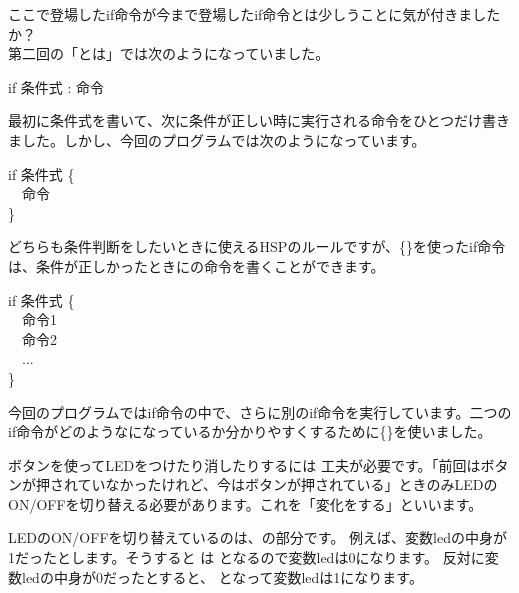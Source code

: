 \documentclass[text03.tex]{subfiles}
\begin{document}
ここで登場したif命令が今まで登場したif命令とは少しうことに気が付きましたか？\\
第二回の「とは」では次のようになっていました。\\
\begin{center}
 					if 条件式 : 命令 \\
\end{center}
最初に条件式を書いて、次に条件が正しい時に実行される命令をひとつだけ書きました。しかし、今回のプログラムでは次のようになっています。\\
\begin{center}
  \begin{minipage}{4cm}
    if 条件式 \{\\ \ \ 命令\\ \}
  \end{minipage}
\end{center}
どちらも条件判断をしたいときに使えるHSPのルールですが、\{\}を使ったif命令は、条件が正しかったときにの命令を書くことができます。\\
\begin{center}
  \begin{minipage}{4cm}
					if 条件式 \{\\
					  \ \ 命令1\\
					  \ \ 命令2\\
					  \ \ ...\\
					\}\\
  \end{minipage}
\end{center}
今回のプログラムではif命令の中で、さらに別のif命令を実行しています。二つのif命令がどのようなになっているか分かりやすくするために\{\}を使いました。\\

\begin{center}

\end{center}

ボタンを使ってLEDをつけたり消したりするには 工夫が必要です。「前回はボタンが押されていなかったけれど、今はボタンが押されている」ときのみLEDのON/OFFを切り替える必要があります。これを「変化をする」といいます。

LEDのON/OFFを切り替えているのは、の部分です。
例えば、変数ledの中身が1だったとします。そうすると は となるので変数ledは0になります。
反対に変数ledの中身が0だったとすると、 となって変数ledは1になります。
\end{document}
